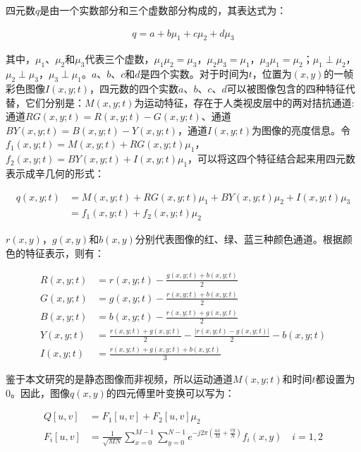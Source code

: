 四元数$q$是由一个实数部分和三个虚数部分构成的，其表达式为：
\begin{linenomath}
\begin{align}
q=a+b\mu_{1}+c\mu_{2}+d\mu_{3}
\label{式4_10}
\end{align}
\end{linenomath}
其中，$\mu_{1}$、$\mu_{2}$和$\mu_{3}$代表三个虚数，$\mu_{1}\mu_{2}=\mu_{3}$，$\mu_{2}\mu_{3}=\mu_{1}$，$\mu_{3}\mu_{1}=\mu_{2}$；$\mu_{1}\perp\mu_{2}$，$\mu_{2}\perp\mu_{3}$，$\mu_{3}\perp\mu_{1}$。$a$、$b$、$c$和$d$是四个实数。对于时间为$t$，位置为$(x,y)$的一帧彩色图像$I(x,y;t)$，四元数的四个实数$a$、$b$、$c$、$d$可以被图像包含的四种特征代替，它们分别是：$M(x,y;t)$为运动特征，存在于人类视皮层中的两对拮抗通道:通道$RG(x,y;t)=R(x,y;t)-G(x,y;t)$、通道$BY(x,y;t)=B(x,y;t)-Y(x,y;t)$，通道$I(x,y;t)$为图像的亮度信息。令$f_{1}(x,y;t)=M(x,y;t)+RG(x,y;t)\mu_{1}$，$f_{2}(x,y;t)=BY(x,y;t)+I(x,y;t)\mu_{1}$，可以将这四个特征结合起来用四元数表示成辛几何的形式：
\begin{linenomath}
\begin{align}
q(x,y;t) &= M(x,y;t)+RG(x,y;t)\mu_1+BY(x,y;t)\mu_2+I(x,y;t)\mu_3\nonumber\\
 &= f_1(x,y;t)+f_2(x,y;t)\mu_2
\label{式4_11}
\end{align}
\end{linenomath}
$r(x,y)$，$g(x,y)$和$b(x,y)$分别代表图像的红、绿、蓝三种颜色通道。根据颜色的特征表示，则有：
\begin{linenomath}
\begin{align}
R(x,y;t) &= r(x,y;t)-\frac{g(x,y;t)+b(x,y;t)}{2}\label{式4_12}\\
G(x,y;t) &= g(x,y;t)-\frac{r(x,y;t)+b(x,y;t)}{2}\label{式4_13}\\
B(x,y;t) &= b(x,y;t)-\frac{r(x,y;t)+g(x,y;t)}{2}\label{式4_14}\\
Y(x,y;t) &= \frac{r(x,y;t)+g(x,y;t)}{2}-\frac{\left|r(x,y;t)-g(x,y;t)\right|}{2}-b(x,y;t)\label{式4_15}\\
I(x,y;t) &= \frac{r(x,y;t)+g(x,y;t)+b(x,y;t)}{3}\label{式4_16}
\end{align}
\end{linenomath}
鉴于本文研究的是静态图像而非视频，所以运动通道$M(x,y;t)$和时间$t$都设置为0。因此，图像$q(x,y)$的四元傅里叶变换可以写为：
\begin{linenomath}
\begin{align}
Q[u,v] &= F_1[u,v]+F_2[u,v]\mu_2\label{式4_17}\\
F_i[u,v] &= \frac{1}{\sqrt{MN}}\sum_{x=0}^{M-1}\sum_{y=0}^{N-1}e^{-j 2\pi\left(\frac{ux}{M}+\frac{vy}{N}\right)}f_{i}(x,y)\quad i=1,2
\label{式4_18}
\end{align}
\end{linenomath}
